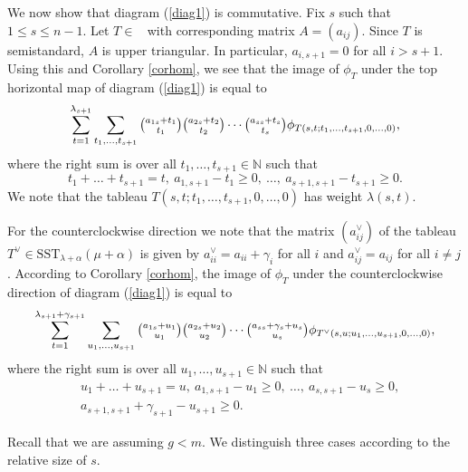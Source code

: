 \documentclass[ALCO,Unicode]{cedram}
\newcommand{\al}{\alpha}
\newcommand{\la}{\lambda}
\DeclareMathOperator{\st}{SST_{\la}(\mu)}
\numberwithin{equation}{section}
\begin{document}
We now show that diagram (\ref{diag1}) is commutative. Fix $s$ such that $1 \le s \le n-1$. Let $ T \in \st$ with corresponding matrix $A=(a_{ij})$. Since $T$ is semistandard, $A$ is upper triangular. In particular, $a_{i, s+1}=0$ for all $i>s+1$. Using this and Corollary \ref{corhom}, we see that the image of $\phi_T$ under the top horizontal map of diagram (\ref{diag1}) is equal to \begin{equation}\label{eq111}
	\sum_{t=1}^{\lambda_{s+1}}\sum_{t_1,\dots,t_{s+1}}\tbinom{a_{1s}+t_1}{t_1}\tbinom{a_{2s}+t_2}{t_2} \cdots \tbinom{a_{ss}+t_s}{t_s}\phi_{T(s,t;t_1,\dots,t_{s+1},0,\dots,0)},\end{equation}
	where the right sum is over all  $t_1,\dots,t_{s+1} \in \mathbb{N} $ such that \begin{equation}\label{ineq1111}t_{1}+\dots+t_{s+1}=t,\  a_{1,s+1}-t_1 \ge 0, \ \dots, \ a_{s+1,s+1}-t_{s+1} \ge 0.\end{equation}
We note that the tableau $T(s,t;t_1,\dots,t_{s+1},0,\dots,0)$ has weight $\la(s,t)$.

For the counterclockwise direction we note that the matrix $(a^{\vee}_{ij})$ of the tableau $T^{\vee} \in \mathrm{SST}_{\la+\al}(\mu+\al)$ is given by $a^{\vee}_{ii} = a_{ii}+\gamma_i$ for all $i$ and $a^{\vee}_{ij} = a_{ij}$ for all $i \neq j$. According to Corollary \ref{corhom}, the image of $\phi_T$ under the counterclockwise direction of diagram (\ref{diag1}) is equal to \begin{equation}\label{eq211}
	\sum_{t=1}^{\lambda_{s+1}+\gamma_{s+1}}\sum_{u_1,\dots,u_{s+1}}\tbinom{a_{1s}+u_1}{u_1}\tbinom{a_{2s}+u_2}{u_2} \cdots \tbinom{a_{ss}+\gamma_s+u_s}{u_s}\phi_{T^{\vee}(s,u;u_1,\dots,u_{s+1},0,\dots,0)},\end{equation}
where the right sum is over all $u_1,\dots,u_{s+1} \in \mathbb{N}$ such that \begin{align*}&u_{1}+\dots+u_{s+1}=u, \  a_{1,s+1}-u_1 \ge 0, \  \dots, \  a_{s,s+1}-u_s \ge 0, \\ &a_{s+1,s+1}+\gamma_{s+1}-u_{s+1} \ge 0.\end{align*}

Recall that we are assuming $g<m$. We distinguish three cases according to the relative size of $s.$ 
\end{document}

